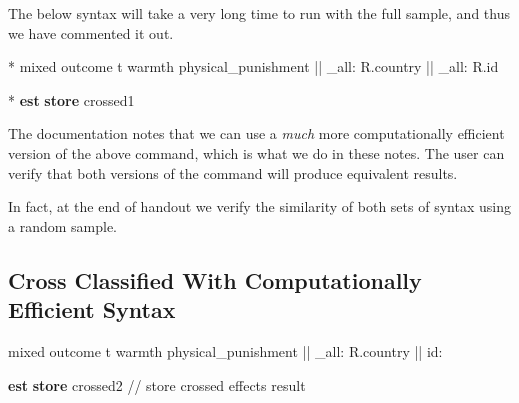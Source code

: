 \documentclass[
  letterpaper,
  DIV=11,
  numbers=noendperiod]{scrreprt}
\newenvironment{Shaded}{\begin{snugshade}}{\end{snugshade}}
\newcommand{\CommentTok}[1]{\textcolor[rgb]{0.37,0.37,0.37}{#1}}
\newcommand{\DataTypeTok}[1]{\textcolor[rgb]{0.68,0.00,0.00}{#1}}
\newcommand{\KeywordTok}[1]{\textcolor[rgb]{0.00,0.23,0.31}{\textbf{#1}}}
\newcommand{\NormalTok}[1]{\textcolor[rgb]{0.00,0.23,0.31}{#1}}
\begin{document}
The below syntax will take a very long time to run with the full sample,
and thus we have commented it out.

\begin{Shaded}
\begin{Highlighting}[]
    
\NormalTok{* mixed outcome t warmth physical\_punishment || }\DataTypeTok{\_all}\NormalTok{: R.country || }\DataTypeTok{\_all}\NormalTok{: R.id}
    
\NormalTok{* }\KeywordTok{est} \KeywordTok{store}\NormalTok{ crossed1}
\end{Highlighting}
\end{Shaded}

The documentation notes that we can use a \emph{much} more
computationally efficient version of the above command, which is what we
do in these notes. The user can verify that both versions of the command
will produce equivalent results.

In fact, at the end of handout we verify the similarity of both sets of
syntax using a random sample.

\subsection{Cross Classified With Computationally Efficient
Syntax}\label{cross-classified-with-computationally-efficient-syntax}

\begin{Shaded}
\begin{Highlighting}[]

\NormalTok{mixed outcome t warmth physical\_punishment || }\DataTypeTok{\_all}\NormalTok{: R.country || id:}
    
\KeywordTok{est} \KeywordTok{store}\NormalTok{ crossed2 }\CommentTok{// store crossed effects result}
\end{Highlighting}
\end{Shaded}
\end{document}
